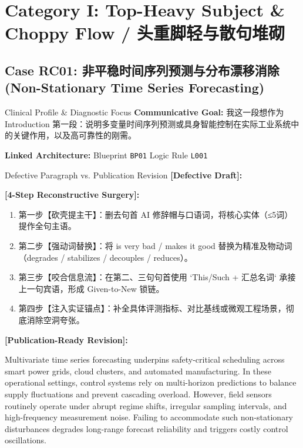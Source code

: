 \section{Category I: Top-Heavy Subject \& Choppy Flow / 头重脚轻与散句堆砌}
\subsection{Case RC01: 非平稳时间序列预测与分布漂移消除 (Non-Stationary Time Series Forecasting)}\label{case:RC01}
\begin{ConceptBox}{Clinical Profile \& Diagnostic Focus}
\textbf{Communicative Goal:} 我这一段想作为 Introduction 第一段：说明多变量时间序列预测或具身智能控制在实际工业系统中的关键作用，以及高可靠性的刚需。\par
\textbf{Linked Architecture:} Blueprint \texttt{BP01} \enspace\textbar\enspace Logic Rule \texttt{L001}
\end{ConceptBox}
\begin{ExampleBox}{Defective Paragraph vs. Publication Revision}
\textbf{\color{TargetHighlight}[Defective Draft]:}\par
{}\par\vspace{6pt}
\textbf{\color{AcadForest}[4-Step Reconstructive Surgery]:}
\begin{enumerate}[label=\textbf{\color{AcadNavy}Step \arabic*:}, leftmargin=2em]
  \item 第一步【砍壳提主干】：删去句首 AI 修辞帽与口语词，将核心实体（≤5词）提作全句主语。
  \item 第二步【强动词替换】：将 is very bad / makes it good 替换为精准及物动词（degrades / stabilizes / decouples / reduces）。
  \item 第三步【咬合信息流】：在第二、三句句首使用 `This/Such + 汇总名词` 承接上一句宾语，形成 Given-to-New 锁链。
  \item 第四步【注入实证锚点】：补全具体评测指标、对比基线或微观工程场景，彻底消除空洞夸张。
\end{enumerate}\vspace{4pt}
\textbf{\color{AcadNavy}[Publication-Ready Revision]:}\par
Multivariate time series forecasting underpins safety-critical scheduling across smart power grids, cloud clusters, and automated manufacturing. In these operational settings, control systems rely on multi-horizon predictions to balance supply fluctuations and prevent cascading overload. However, field sensors routinely operate under abrupt regime shifts, irregular sampling intervals, and high-frequency measurement noise. Failing to accommodate such non-stationary disturbances degrades long-range forecast reliability and triggers costly control oscillations.
\end{ExampleBox}
